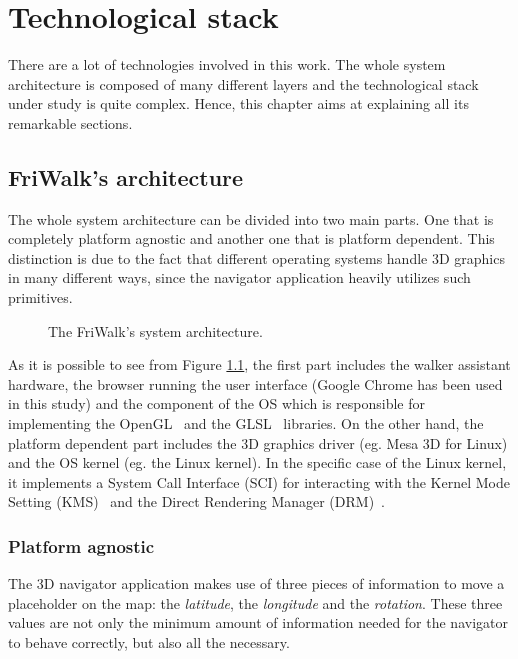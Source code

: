 \chapter{Technological stack} \label{cha:tech_stack}

There are a lot of technologies involved in this work. The whole system
architecture is composed of many different layers and the technological
stack under study is quite complex. Hence, this chapter aims at explaining
all its remarkable sections.


\section{FriWalk's architecture}\label{sec:friwalk_architecture}
The whole system architecture can be divided into two main parts. One that
is completely platform agnostic and another one that is platform dependent.
This distinction is due to the fact that different operating systems handle
3D graphics in many different ways, since the navigator application heavily
utilizes such primitives.
\begin{figure}[!htb]
    \caption{The FriWalk's system architecture.}
    \label{img:system_arch}
\end{figure}

As it is possible to see from Figure \ref{img:system_arch}, the first part includes
the walker assistant hardware, the browser running the
user interface (Google Chrome has been used in this study) and the component of
the OS which is responsible for implementing the OpenGL~\cite{woo1999opengl}
and the GLSL~\cite{marroquim2009introduction} libraries. On the other hand,
the platform dependent part includes the 3D graphics driver (eg. Mesa 3D for
Linux) and the OS kernel (eg. the Linux kernel). In the specific case of the
Linux kernel, it implements a System Call Interface (SCI) for interacting
with the Kernel Mode Setting (KMS)~\cite{linuxkms} and the Direct Rendering Manager
(DRM)~\cite{paul2000introduction}.


\subsection{Platform agnostic}
The 3D navigator application makes use of three pieces of information to move a
placeholder on the map: the \emph{latitude}, the \emph{longitude} and the
\emph{rotation}. These three values are not only the minimum amount of information
needed for the navigator to behave correctly, but also all the necessary.

